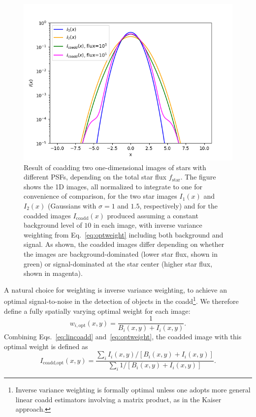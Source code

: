 \documentclass[modern]{style_and_logos/lsstdescnote}
\begin{document}
\begin{figure}
\begin{center}
\includegraphics[width=5.5in]{figures/coadd_psf.png}
 \caption{Result of coadding two one-dimensional images of stars with different PSFs, depending on the total star flux $f_\text{star}$.  The figure shows the 1D images, all normalized to integrate to one for convenience of comparison, for the two star images $I_1(x)$ and $I_2(x)$ (Gaussians with $\sigma=1$ and $1.5$, respectively) and for the coadded images $I_\text{coadd}(x)$ produced assuming a constant background level of $10$ in each image, with inverse variance weighting from Eq.~\eqref{eq:optweight} including both background and signal.  As shown, the coadded images differ depending on whether the images are background-dominated (lower star flux, shown in green) or signal-dominated at the star center (higher star flux, shown in magenta).   } \label{fig:coadd_psf}
\end{center}
 \end{figure}
 
A natural choice for weighting is inverse variance weighting, to achieve an optimal signal-to-noise in the detection of objects in the coadd\footnote{Inverse variance weighting is formally optimal unless one adopts more general linear coadd estimators involving a matrix product, as in the Kaiser approach.}.  We therefore define a fully spatially varying optimal weight for each image:
\begin{equation}\label{eq:optweight}
    w_{i,\text{opt}}(x,y) = \frac{1}{B_i(x,y)+I_i(x,y)}.
\end{equation}
Combining Eqs.~\eqref{eq:lincoadd} and~\eqref{eq:optweight}, the coadded image with this optimal weight is defined as
\begin{equation}\label{eq:optcoadd}
    I_\text{coadd,opt}(x,y) = \frac{\sum_i I_i(x,y)/\left[B_i(x,y)+I_i(x,y)\right]}{\sum_i 1/\left[B_i(x,y)+I_i(x,y)\right]}.
\end{equation}
\end{document}
